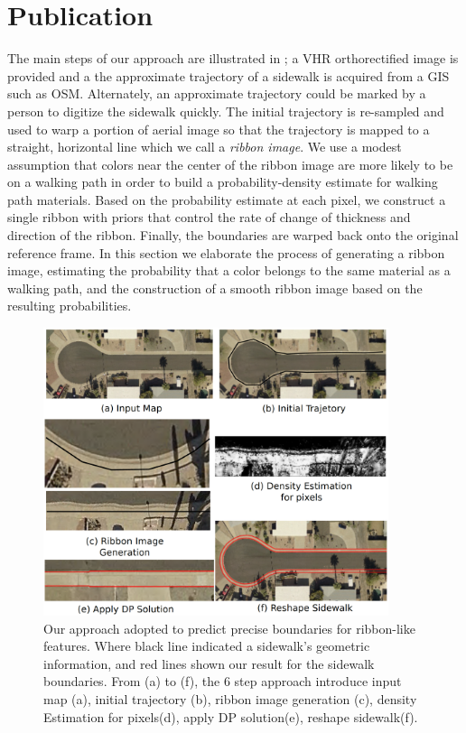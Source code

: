 \chapter{Publication}

The main steps of our approach are illustrated in ; a \ac{VHR} orthorectified image is provided and a the approximate trajectory of a sidewalk is acquired from a \ac{GIS} such as \ac{OSM}. Alternately, an approximate trajectory could be marked by a person to digitize the sidewalk quickly. The initial trajectory is re-sampled and used to warp a portion of aerial image so that the trajectory is mapped to a straight, horizontal line which we call a \textit{ribbon image}.  We use a modest assumption that colors near the center of the ribbon image are more likely to be on a walking path in order to build a probability-density estimate for walking path materials. Based on the probability estimate at each pixel, we construct a single ribbon with priors that control the rate of change of thickness and direction of the ribbon. Finally, the boundaries are warped back onto the original reference frame. In this section we elaborate the process of generating a ribbon image, estimating the probability that a color belongs to the same material as a walking path, and the construction of a smooth ribbon image based on the resulting probabilities. 

\begin{figure}[H]
\begin{center}
\includegraphics[width=0.9\textwidth]{Figures/diagram.png}
\caption[Framework Overview 2]{Our approach adopted to predict precise boundaries for ribbon-like features. Where black line indicated a sidewalk's geometric information, and red lines shown our result for the sidewalk boundaries. From (a) to (f), the 6 step approach introduce input map (a), initial trajectory (b), ribbon image generation (c), density Estimation for pixels(d), apply \ac{DP} solution(e), reshape sidewalk(f).}
\label{fig:Apparatus}
\end{center}
\end{figure}

